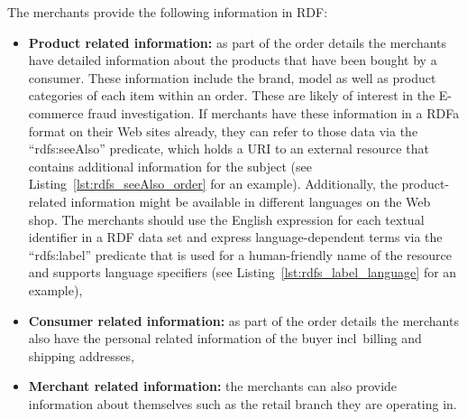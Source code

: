 The merchants provide the following information in \gls{RDF}:\@

\begin{itemize}
  \item \textbf{Product related information:} as part of the order details the merchants have detailed information about the products that have been bought by a consumer. These information include the brand, model as well as product categories of each item within an order. These are likely of interest in the \gls{E-commerce} fraud investigation. If merchants have these information in a \gls{RDFa} format on their Web sites already, they can refer to those data via the ``rdfs:seeAlso'' predicate, which holds a \gls{URI} to an external resource that contains additional information for the subject (see Listing~\ref{lst:rdfs_seeAlso_order} for an example). Additionally, the product-related information might be available in different languages on the Web shop. The merchants should use the English expression for each textual identifier in a \gls{RDF} data set and express language-dependent terms via the ``rdfs:label'' predicate that is used for a human-friendly name of the resource and supports language specifiers (see Listing~\ref{lst:rdfs_label_language} for an example),
  \item \textbf{Consumer related information:} as part of the order details the merchants also have the personal related information of the buyer \gls{incl}\ billing and shipping addresses,
  \item \textbf{Merchant related information:} the merchants can also provide information about themselves such as the retail branch they are operating in.
\end{itemize}




